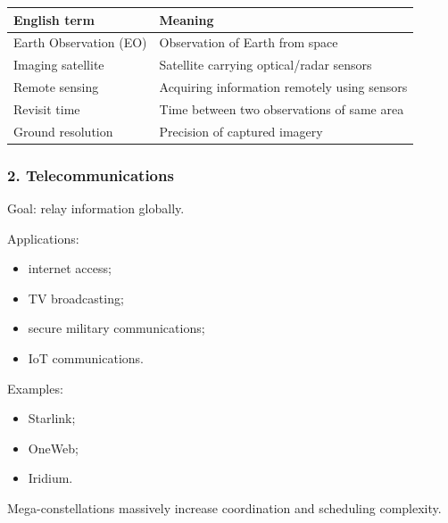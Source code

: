 \documentclass[10pt,a4paper,twocolumn]{article}
\begin{document}
\begin{vocabbox}
    \begin{tabularx}{\columnwidth}{lX}
        \toprule
        English term           & Meaning                                      \\
        \midrule
        Earth Observation (EO) & Observation of Earth from space              \\
        Imaging satellite      & Satellite carrying optical/radar sensors     \\
        Remote sensing         & Acquiring information remotely using sensors \\
        Revisit time           & Time between two observations of same area   \\
        Ground resolution      & Precision of captured imagery                \\
        \bottomrule
    \end{tabularx}
\end{vocabbox}


\subsubsection*{2. Telecommunications}

Goal:
relay information globally.

Applications:
\begin{itemize}
    \item internet access;
    \item TV broadcasting;
    \item secure military communications;
    \item IoT communications.
\end{itemize}

Examples:
\begin{itemize}
    \item Starlink;
    \item OneWeb;
    \item Iridium.
\end{itemize}

\begin{keybox}
    Mega-constellations massively increase coordination and scheduling complexity.
\end{keybox}

\end{document}
